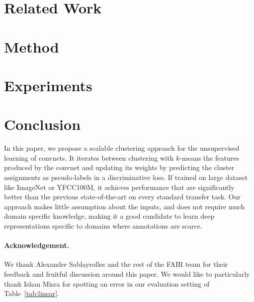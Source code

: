\documentclass[runningheads]{llncs}
\begin{document}
\section{Related Work}





\section{Method}



\section{Experiments}




\section{Conclusion}

In this paper, we propose a scalable clustering approach for the unsupervised learning of convnets.
It iterates between clustering  with $k$-means the features produced by the convnet and
updating its weights by predicting the cluster assignments as pseudo-labels in a discriminative loss.
If trained on large dataset like ImageNet or YFCC100M, it achieves performance that are significantly
better than the previous state-of-the-art on every standard transfer task.
Our approach makes little assumption about the inputs, and does not require much domain specific knowledge, making it a
good candidate to learn deep representations specific to domains where annotations are scarce.

\paragraph{Acknowledgement.}
We thank Alexandre Sablayrolles and the rest of the FAIR team for their feedback and fruitful discussion around this paper.
We would like to particularly thank Ishan Misra for spotting an error in our evaluation setting of Table~\ref{tab:linear}.

\clearpage




\clearpage

\end{document}
